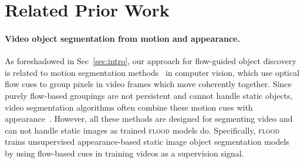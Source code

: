 \documentclass{article}
\begin{document}














\section{Related Prior Work}
\label{sec:related_work}



\paragraph{Video object segmentation from motion and appearance.} As foreshadowed in Sec~\ref{sec:intro}, our approach for flow-guided object discovery is related to motion segmentation methods~\cite{shi1998motion,tron2007benchmark,yan2006general,tokmakov2017learning,keuper2018motion,bideau2018moa, yang2021rigidmask} in computer vision, which use optical flow cues to group pixels in video frames which move coherently together. Since purely flow-based groupings are not persistent and cannot handle static objects, video segmentation algorithms often combine these motion cues with appearance~\cite{weiss1995perceptually, jain2017fusionseg, tokmakov2017learning, cheng2017segflow}. However, all these methods are designed for segmenting video and can not handle static images as trained \textsc{flood} models do. Specifically, \textsc{flood} trains unsupervised appearance-based static image object segmentation models by using flow-based cues in training videos as a supervision signal.
\end{document}
